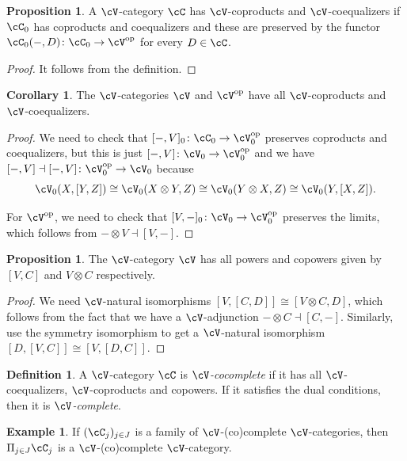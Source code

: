 \documentclass[a4paper,11pt,oneside,openany]{scrbook}
\DeclareMathOperator{\op}{\text{op}}
\theoremstyle{definition}
\theoremstyle{definition}
\newtheorem{defn}[thm]{Definition} %
\newtheorem{prop}[thm]{Proposition}
\newtheorem{cor}[thm]{Corollary}
\newtheorem{exmp}[thm]{Example}
\begin{document}
\begin{prop}
    A $\cV$-category $\cC$ has $\cV$-coproducts and $\cV$-coequalizers if $\cC_0$ has coproducts and coequalizers and these are preserved by the functor $\cC_0(-,D)\colon\cC_0\rightarrow\cV^{\op}$ for every $D\in\cC$.
\end{prop}

\begin{proof}
    It follows from the definition.
\end{proof}

\begin{cor}
    The $\cV$-categories $\cV$ and $\cV^{\op}$ have all $\cV$-coproducts and $\cV$-coequalizers.
\end{cor}

\begin{proof}
    We need to check that $[-,V]_0\colon\cC_0\rightarrow\cV_0^{\op}$ preserves coproducts and coequalizers, but this is just $[-,V]\colon\cV_0\rightarrow\cV_0^{\op}$ and we have $[-,V]\dashv[-,V]\colon\cV_0^{\op}\rightarrow\cV_0$ because
    $$\cV_0(X,[Y,Z])\cong\cV_0(X\otimes Y,Z)\cong\cV_0(Y\otimes X,Z)\cong\cV_0(Y,[X,Z]).$$
    
    For $\cV^{\op}$, we need to check that $[V,-]_0\colon\cV_0\rightarrow\cV_0^{\op}$ preserves the limits, which follows from $-\otimes V\dashv [V,-]$.
\end{proof}

\begin{prop}
    The $\cV$-category $\cV$ has all powers and copowers given by $[V,C]$ and $V\otimes C$ respectively.
\end{prop}

\begin{proof}
    We need $\cV$-natural isomorphisms $[V,[C,D]]\cong[V\otimes C,D]$, which follows from the fact that we have a $\cV$-adjunction $-\otimes C\dashv [C,-]$. Similarly, use the symmetry isomorphism to get a $\cV$-natural isomorphism $[D,[V,C]]\cong[V,[D,C]]$.
\end{proof}

\begin{defn}
    A $\cV$-category $\cC$ is \emph{$\cV$-cocomplete} if it has all $\cV$-coequalizers, $\cV$-coproducts and copowers. If it satisfies the dual conditions, then it is \emph{$\cV$-complete}.
\end{defn}

\begin{exmp}
    If $(\cC_j)_{j\in J}$ is a family of $\cV$-(co)complete $\cV$-categories, then $\Pi_{j\in J}\cC_j$ is a $\cV$-(co)complete $\cV$-category.
\end{exmp}
\end{document}
